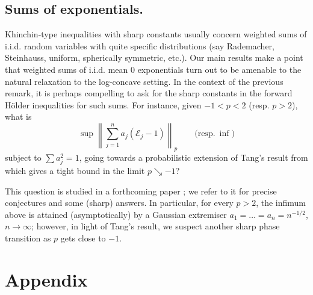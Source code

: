 \documentclass[10pt]{amsart}
\newcommand{\1}{\textbf{1}}
\newcommand{\red}{}
\newcommand{\cE}{\mathcal{E}}
\theoremstyle{remark}
\theoremstyle{definition}
\begin{document}
\subsection{Sums of exponentials.}
Khinchin-type inequalities with sharp constants usually concern weighted sums of i.i.d. random variables with quite specific distributions (say Rademacher, Steinhauss, uniform, spherically symmetric, etc.). Our main results make a point that weighted sums of i.i.d. mean $0$ exponentials turn out to be amenable to the natural relaxation to the log-concave setting. In the context of the previous remark, it is perhaps compelling to ask for the sharp constants in  the forward H\"older inequalities for such sums. For instance, given $-1 < p < 2$ {\red (resp. $p > 2$)}, what is
\[ 
{\red \sup} \left\|\textstyle\sum_{j=1}^n a_j(\cE_j -1)\right\|_p \qquad {\red \text{(resp.} \ \inf)}
 \]
subject to $\sum a_j^2 = 1$, going towards a probabilistic extension of Tang's result from \cite{Tang} which gives a tight bound in the limit $p \searrow -1$?

{\red This question is studied in a forthcoming paper \cite{BTT}; we refer to it for precise conjectures and some (sharp) answers. In particular, for every $p > 2$, the infimum above is attained (asymptotically) by a Gaussian extremiser $a_1 = \dots = a_n = n^{-1/2}$, $n \to \infty$; however, in light of Tang's result, we suspect another sharp phase transition as $p$ gets close to $-1$.}







\appendix

\section*{Appendix}\label{appendix}
\end{document}
